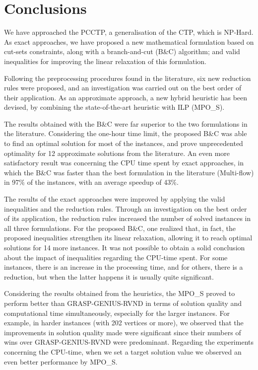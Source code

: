 \documentclass{singlecol-new}
\theoremstyle{TH}{
\newtheorem{lemma}{Lemma}
\newtheorem{theorem}[lemma]{Theorem}
\newtheorem{corrolary}[lemma]{Corrolary}
\newtheorem{conjecture}[lemma]{Conjecture}
\newtheorem{proposition}[lemma]{Proposition}
\newtheorem{claim}[lemma]{Claim}
\newtheorem{stheorem}[lemma]{Wrong Theorem}
}
\theoremstyle{THrm}{
\newtheorem{definition}{Definition}[section]
\newtheorem{question}{Question}[section]
\newtheorem{remark}{Remark}
\newtheorem{scheme}{Scheme}
}
\theoremstyle{THhit}{
\newtheorem{case}{Case}[section]
}
\begin{document}
\section{Conclusions}
\label{sec:conclusions}

We have approached the PCCTP, a generalisation of the CTP, which is NP-Hard. As exact approaches, we have proposed a new mathematical formulation based on cut-sets constraints, along with a branch-and-cut (B\&C) algorithm; and valid inequalities for improving the linear relaxation of this formulation. 

Following the preprocessing procedures found in the literature, six new reduction rules were proposed, and an investigation was carried out on the best order of their application. As an approximate approach, a new hybrid heuristic has been devised, by combining the state-of-the-art heuristic with ILP (MPO\_S).

The results obtained with the B\&C were far superior to the two formulations in the literature. Considering the one-hour time limit, the proposed B\&C was able to find an optimal solution for most of the instances, and prove unprecedented  optimality for 12 approximate solutions from the literature. An even more satisfactory result was concerning the CPU time spent by exact approaches, in which the B\&C was faster than the best formulation in the literature (Multi-flow) in 97\% of the instances, with an average speedup of 43\%. 


The results of the exact approaches were improved by applying the valid inequalities and the reduction rules. Through an investigation on the best order of its application, the reduction rules increased the number of solved instances in all three formulations. For the proposed B\&C, one realized that, in fact, the proposed inequalities strengthen its linear relaxation, allowing it to reach optimal solutions for 14 more instances. It was not possible to obtain a solid conclusion about the impact of inequalities regarding the CPU-time spent. For some instances, there is an increase in the processing time, and for others, there is a reduction, but when the latter happens it is usually quite significant.


Considering the results obtained from the heuristics, the MPO\_S  proved to perform better than GRASP-GENIUS-RVND in terms of solution quality and computational time simultaneously, especially for the larger instances. For example, in harder instances (with 202 vertices or more), we observed that the improvements in solution quality made were significant since their numbers of wins over GRASP-GENIUS-RVND were predominant.  Regarding the experiments concerning the CPU-time, when we set a target solution value we observed an even better performance by MPO\_S.
\end{document}
